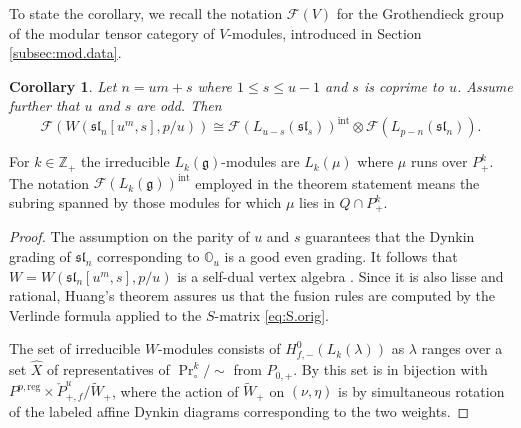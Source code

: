 \documentclass[12pt]{amsart}
\theoremstyle{plain}
\newtheorem{cor}[thm]{Corollary}
\theoremstyle{definition}
\numberwithin{equation}{section}
\newcommand{\laset}{\widehat{X}}
\newcommand{\la}{\lambda}
\newcommand{\Z}{\mathbb{Z}}
\newcommand{\g}{\mathfrak{g}}
\newcommand{\sll}{\mathfrak{sl}}
\newcommand{\CF}{\mathcal{F}}
\newcommand{\wtil}[1]{\widetilde#1}
\newcommand{\mbo}{\mathbb{O}}
\DeclareMathOperator{\prin}{Pr}
\begin{document}
To state the corollary, we recall the notation $\CF(V)$ for the Grothendieck group of the modular tensor category of $V$-modules, introduced in Section \ref{subsec:mod.data}.
\begin{cor}
Let $n = um+s$ where $1 \leq s \leq u-1$ and $s$ is coprime to $u$. Assume further that $u$ and $s$ are odd. Then
\[
\CF(W(\sll_n[u^m, s], p/u)) \cong \CF(L_{u-s}(\sll_s))^{\text{int}} \otimes \CF(L_{p-n}(\sll_n)).
\]
\end{cor}

For $k \in \Z_+$ the irreducible $L_k(\g)$-modules are $L_k(\mu)$ where $\mu$ runs over $P_+^k$. The notation $\CF(L_{k}(\g))^{\text{int}}$ employed in the theorem statement means the subring spanned by those modules for which $\mu$ lies in $Q \cap P_+^k$.

\begin{proof}
The assumption on the parity of $u$ and $s$ guarantees that the Dynkin grading of $\sll_n$ corresponding to $\mbo_u$ is a good even grading. It follows that $W = W(\sll_n[u^m, s], p/u)$ is a self-dual vertex algebra {\cite[Proposition 4.2]{AEM2024}}. Since it is also lisse and rational, Huang's theorem \cite{Huang-rigidity} assures us that the fusion rules are computed by the Verlinde formula applied to the $S$-matrix \eqref{eq:S.orig}.

The set of irreducible $W$-modules consists of $H_{f, -}^0(L_k(\la))$ as $\la$ ranges over a set $\laset$ of representatives of $\prin_\circ^k / \sim$ from $P_{0, +}$. By {\cite[Theorem 8.7]{AE2023}} this set is in bijection with $P^{p, \text{reg}} \times \check{P}^{u}_{+, f} / \wtil{W}_+$, where the action of $\wtil{W}_+$ on $(\nu, \eta)$ is by simultaneous rotation of the labeled affine Dynkin diagrams corresponding to the two weights.


\end{proof}
\end{document}
